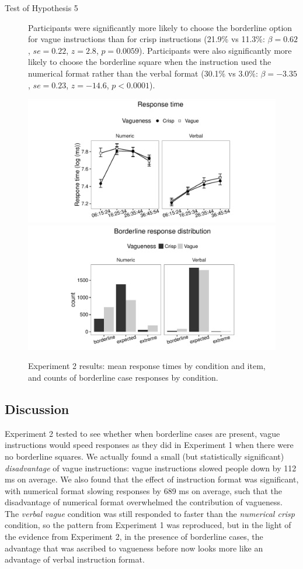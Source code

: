 \begin{description}
	\item [Test of Hypothesis 5] Participants were significantly more likely to choose the borderline option for vague instructions than for crisp instructions (21.9\% vs 11.3\%: $\beta=0.62$, $se=0.22$, $z=2.8$, $p=0.0059$). Participants were also significantly more likely to choose the borderline square when the instruction used the numerical format rather than the verbal format (30.1\% vs 3.0\%: $\beta=-3.35$, $se=0.23$, $z=-14.6$, $p<0.0001$). 
\end{description}

\begin{figure}[htbp]
\centering
\includegraphics[trim = 20mm 0mm 35mm 0mm, clip, width=.49\textwidth]{figures/e2-rtplot-1.pdf}
\includegraphics[trim = 20mm 0mm 35mm 0mm, clip, width=.49\textwidth]{figures/e2-blBarChart-1}
\caption{Experiment 2 results: mean response times by condition and item, and counts of borderline case responses by condition.}
\label{resultse2}
\end{figure}

\subsection{Discussion}

Experiment 2 tested to see whether when borderline cases are present, vague instructions would speed responses as they did in Experiment 1 when there were no borderline squares. 
We actually found a small (but statistically significant) \emph{disadvantage} of vague instructions: vague instructions slowed people down by 112 ms on average. We also found that the effect of instruction format was significant, with numerical format slowing responses by 689 ms on average, such that the disadvantage of numerical format overwhelmed the contribution of vagueness. The \emph{verbal vague} condition was still responded to faster than the \emph{numerical crisp} condition, so the pattern from Experiment 1 was reproduced, but in the light of the evidence from Experiment 2, in the presence of borderline cases, the advantage that was ascribed to vagueness before now looks more like an advantage of verbal instruction format.

